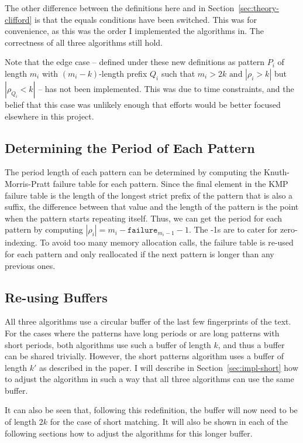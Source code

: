 \documentclass[ %
                    author={Dominic Joseph Moylett},
                    degree={MEng},
                     title={Dictionary Matching with Fingerprints},
                  subtitle={An Empirical Analysis},
                      type={research},
                      year={2015} ]{dissertation}
\begin{document}
The other difference between the definitions here and in Section~\ref{sec:theory-clifford} is that the equals conditions have been switched. This was for convenience, as this was the order I implemented the algorithms in. The correctness of all three algorithms still hold.

Note that the edge case -- defined under these new definitions as pattern $P_i$ of length $m_i$ with $(m_i - k)$-length prefix $Q_i$ such that $m_i > 2k \text{ and } |\rho_i > k|$ but $|\rho_{Q_i} < k|$ -- has not been implemented. This was due to time constraints, and the belief that this case was unlikely enough that efforts would be better focused elsewhere in this project.

\subsection{Determining the Period of Each Pattern}

The period length of each pattern can be determined by computing the Knuth-Morris-Pratt failure table for each pattern. Since the final element in the KMP failure table is the length of the longest strict prefix of the pattern that is also a suffix, the difference between that value and the length of the pattern is the point when the pattern starts repeating itself. Thus, we can get the period for each pattern by computing $|\rho_i| = m_i - \texttt{failure}_{m_i - 1} - 1$. The -1s are to cater for zero-indexing. To avoid too many memory allocation calls, the failure table is re-used for each pattern and only reallocated if the next pattern is longer than any previous ones.

\subsection{Re-using Buffers}

All three algorithms use a circular buffer of the last few fingerprints of the text. For the cases where the patterns have long periods or are long patterns with short periods, both algorithms use such a buffer of length $k$, and thus a buffer can be shared trivially. However, the short patterns algorithm uses a buffer of length $k'$ as described in the paper. I will describe in Section~\ref{sec:impl-short} how to adjust the algorithm in such a way that all three algorithms can use the same buffer.

It can also be seen that, following this redefinition, the buffer will now need to be of length $2k$ for the case of short matching. It will also be shown in each of the following sections how to adjust the algorithms for this longer buffer.
\end{document}
